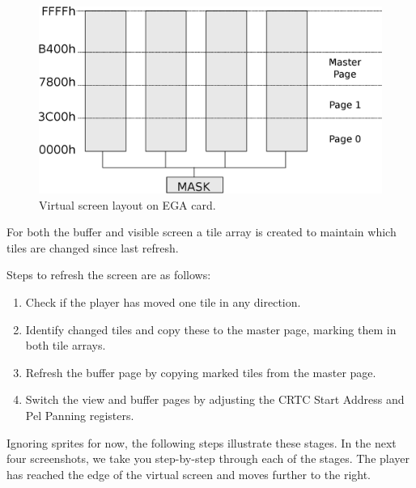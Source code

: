 \documentclass[book.tex]{subfiles}
\begin{document}
\begin{figure}[H]
\centering
\includegraphics[width=\textwidth]{imgs/drawings/ega_ram_architecture.eps}
\caption{Virtual screen layout on EGA card.}
\label{fig:ega_ram_arch}
\end{figure}

\par
For both the buffer and visible screen a tile array is created to maintain which tiles are changed since last refresh.\\


\par
\begin{minipage}{\textwidth}
  
  \end{minipage}
  \label{ega_refresh}
  \par

Steps to refresh the screen are as follows:
\begin{enumerate}
\item Check if the player has moved one tile in any direction.
\item Identify changed tiles and copy these to the master page, marking them in both tile arrays. 
\item Refresh the buffer page by copying marked tiles from the master page.
\item Switch the view and buffer pages by adjusting the CRTC Start Address and Pel Panning registers.
\end{enumerate}


Ignoring sprites for now, the following steps illustrate these stages. In the next four screenshots, we take you step-by-step through each of the stages. The player has reached the edge of the virtual screen and moves further to the right.\\
\end{document}
